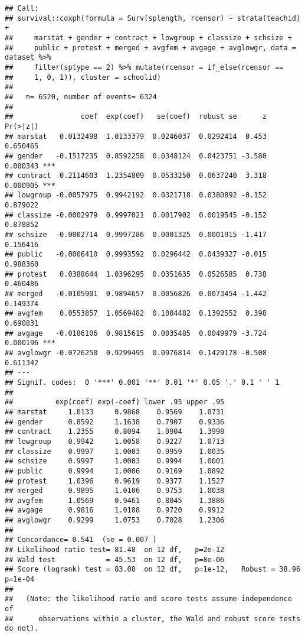 \documentclass[
]{article}
\begin{document}
\begin{verbatim}
## Call:
## survival::coxph(formula = Surv(splength, rcensor) ~ strata(teachid) + 
##     marstat + gender + contract + lowgroup + classize + schsize + 
##     public + protest + merged + avgfem + avgage + avglowgr, data = dataset %>% 
##     filter(sptype == 2) %>% mutate(rcensor = if_else(rcensor == 
##     1, 0, 1)), cluster = schoolid)
## 
##   n= 6520, number of events= 6324 
## 
##                coef  exp(coef)   se(coef)  robust se      z Pr(>|z|)    
## marstat   0.0132498  1.0133379  0.0246037  0.0292414  0.453 0.650465    
## gender   -0.1517235  0.8592258  0.0348124  0.0423751 -3.580 0.000343 ***
## contract  0.2114603  1.2354809  0.0533250  0.0637240  3.318 0.000905 ***
## lowgroup -0.0057975  0.9942192  0.0321718  0.0380892 -0.152 0.879022    
## classize -0.0002979  0.9997021  0.0017902  0.0019545 -0.152 0.878852    
## schsize  -0.0002714  0.9997286  0.0001325  0.0001915 -1.417 0.156416    
## public   -0.0006410  0.9993592  0.0296442  0.0439327 -0.015 0.988360    
## protest   0.0388644  1.0396295  0.0351635  0.0526585  0.738 0.460486    
## merged   -0.0105901  0.9894657  0.0056826  0.0073454 -1.442 0.149374    
## avgfem    0.0553857  1.0569482  0.1004482  0.1392552  0.398 0.690831    
## avgage   -0.0186106  0.9815615  0.0035485  0.0049979 -3.724 0.000196 ***
## avglowgr -0.0726250  0.9299495  0.0976814  0.1429178 -0.508 0.611342    
## ---
## Signif. codes:  0 '***' 0.001 '**' 0.01 '*' 0.05 '.' 0.1 ' ' 1
## 
##          exp(coef) exp(-coef) lower .95 upper .95
## marstat     1.0133     0.9868    0.9569    1.0731
## gender      0.8592     1.1638    0.7907    0.9336
## contract    1.2355     0.8094    1.0904    1.3998
## lowgroup    0.9942     1.0058    0.9227    1.0713
## classize    0.9997     1.0003    0.9959    1.0035
## schsize     0.9997     1.0003    0.9994    1.0001
## public      0.9994     1.0006    0.9169    1.0892
## protest     1.0396     0.9619    0.9377    1.1527
## merged      0.9895     1.0106    0.9753    1.0038
## avgfem      1.0569     0.9461    0.8045    1.3886
## avgage      0.9816     1.0188    0.9720    0.9912
## avglowgr    0.9299     1.0753    0.7028    1.2306
## 
## Concordance= 0.541  (se = 0.007 )
## Likelihood ratio test= 81.48  on 12 df,   p=2e-12
## Wald test            = 45.53  on 12 df,   p=8e-06
## Score (logrank) test = 83.08  on 12 df,   p=1e-12,   Robust = 38.96  p=1e-04
## 
##   (Note: the likelihood ratio and score tests assume independence of
##      observations within a cluster, the Wald and robust score tests do not).
\end{verbatim}
\end{document}
